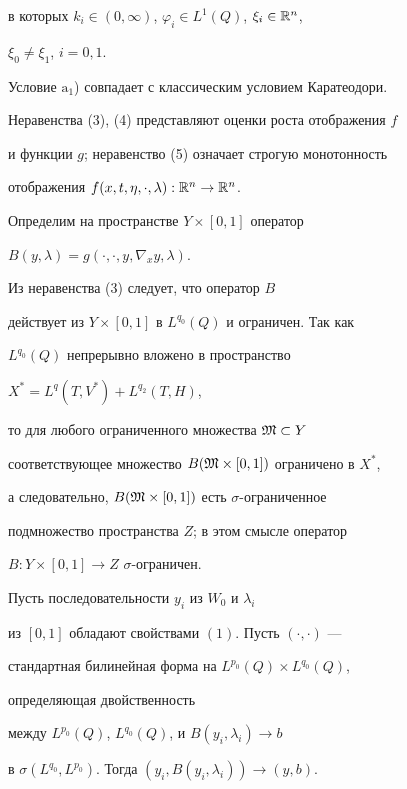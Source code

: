 в которых $k_i\in(0,\infty)$, $\varphi_i\in L^1(Q)$, $\xi_i\in\Bbb R^n$, 


$\xi_0\ne\xi_1$, $i=0,1$. 


 


Условие $\mathrm a_1$) совпадает с классическим условием Каратеодори. 


Неравенства (3), (4) представляют оценки роста отображения $f$ 


и функции $g$; неравенство (5) означает строгую монотонность 


отображения $f(x,t,\eta,\cdot,\lambda):\Bbb R^n\to\Bbb R^n$. 


 


Определим на пространстве $Y\times[0,1]$ оператор 


$B(y,\lambda)=g(\cdot,\cdot,y,\nabla_x y,\lambda)$. 


Из неравенства (3) следует, что оператор $B$ 


действует из $Y\times[0,1]$ в $L^{q_0}(Q)$ и ограничен. Так как 


$L^{q_0}(Q)$ непрерывно вложено в пространство 


$X^*=L^q(T,V^*)+L^{q_2}(T,H)$, 


то для любого ограниченного множества $\frak M\subset Y$ 


соответствующее множество $B(\frak M\times[0,1])$ ограничено в $X^*$, 


а следовательно, $B(\frak M\times[0,1])$ есть $\sigma$-ограниченное 


подмножество пространства $Z$; в этом смысле оператор 


$B:Y\times[0,1]\to Z$\; $\sigma$-ограничен. 


 


\begin{lem} 


Пусть последовательности $y_i$ из $W_0$ и $\lambda_i$ 


из $[0,1]$ обладают свойствами $(1)$. Пусть $(\cdot,\cdot)$ --- 


стандартная билинейная форма на $L^{p_0}(Q)\times L^{q_0}(Q)$, 


определяющая двойственность 


между $L^{p_0}(Q)$, $L^{q_0}(Q)$, и $B(y_i,\lambda_i)\to b$ 


в $\sigma(L^{q_0},L^{p_0})$. Тогда $(y_i,B(y_i,\lambda_i))\to(y,b)$. 


\end{lem} 


